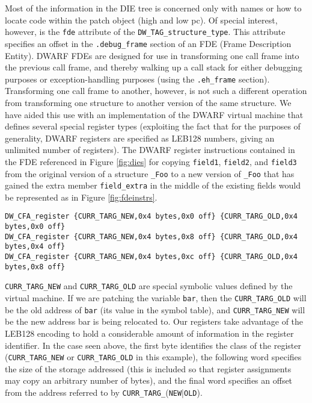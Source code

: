 Most of the information in the DIE tree is concerned only with names
or how to locate code within the patch object (high and low pc). Of
special interest, however, is the \texttt{fde} attribute of the
\texttt{DW\_TAG\_structure\_type}. This attribute specifies an offset
in the \texttt{.debug\_frame} section of an FDE (Frame Description
Entity). DWARF FDEs are designed for use in transforming one call
frame into the previous call frame, and thereby walking up a call
stack for either debugging purposes or exception-handling purposes
(using the \texttt{.eh\_frame} section). Transforming one call frame
to another, however, is not such a different operation from
transforming one structure to another version of the same
structure. We have aided this use with an implementation of the DWARF
virtual machine that defines several special register types
(exploiting the fact that for the purposes of generality, DWARF
registers are specified as LEB128 numbers, giving an unlimited number
of registers). The DWARF register instructions contained in the FDE
referenced in Figure \ref{fig:dies} for copying \texttt{field1}, \texttt{field2}, and
\texttt{field3} from the original version of a structure \texttt{\_Foo}
to a new version of \texttt{\_Foo} that has gained the extra member
\texttt{field\_extra} in the middle of the existing fields would be
represented as in Figure \ref{fig:fdeinstrs}.
\begin{figure*}[ht]
{\small
\begin{center}
\begin{verbatim}
DW_CFA_register {CURR_TARG_NEW,0x4 bytes,0x0 off} {CURR_TARG_OLD,0x4 bytes,0x0 off} 
DW_CFA_register {CURR_TARG_NEW,0x4 bytes,0x8 off} {CURR_TARG_OLD,0x4 bytes,0x4 off} 
DW_CFA_register {CURR_TARG_NEW,0x4 bytes,0xc off} {CURR_TARG_OLD,0x4 bytes,0x8 off} 
\end{verbatim}
\end{center}
}
\caption{FDE instructions for data patching}
\label{fig:fdeinstrs}
\end{figure*}

\texttt{CURR\_TARG\_NEW} and \texttt{CURR\_TARG\_OLD} are special
symbolic values defined by the virtual machine. If we are patching the
variable \texttt{bar}, then the \texttt{CURR\_TARG\_OLD} will be the old address of \texttt{bar}
(its value in the symbol table), and \texttt{CURR\_TARG\_NEW} will be the new
address bar is being relocated to. Our registers take advantage of the
LEB128 encoding to hold a considerable amount of information in the
register identifier. In the case seen above, the first byte identifies
the class of the register (\texttt{CURR\_TARG\_NEW} or \texttt{CURR\_TARG\_OLD} in this
example), the following word specifies the size of the storage
addressed (this is included so that register assignments may copy an
arbitrary number of bytes), and the final word specifies an offset
from the address referred to by \texttt{CURR\_TARG\_}(\texttt{NEW}|\texttt{OLD}).

